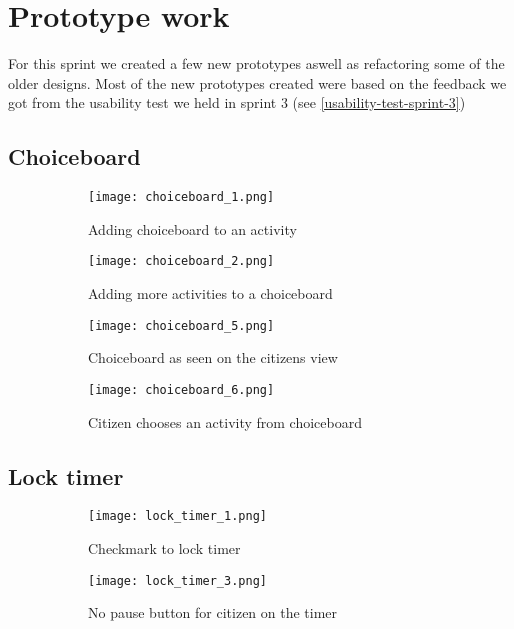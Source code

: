  \section{Prototype work}
For this sprint we created a few new prototypes aswell as refactoring some of the older designs. 
Most of the new prototypes created were based on the feedback we got from the usability test we held in sprint 3 (see \autoref{usability-test-sprint-3})

\subsection{Choiceboard}

\begin{figure}[H]
    \begin{subfigure}{0.5\textwidth}
    \texttt{[image: choiceboard\_1.png]}
    \caption{Adding choiceboard to an activity}
    \label{subfig:choiceboard_1}
    \end{subfigure}
    \begin{subfigure}{0.5\textwidth}
    \texttt{[image: choiceboard\_2.png]}
    \caption{Adding more activities to a choiceboard}
    \label{subfig:choiceboard_2}
    \end{subfigure} 
    \caption{}
    \label{fig:choiceboard_1}
\end{figure}

\begin{figure}[H]
    \begin{subfigure}{0.5\textwidth}
    \texttt{[image: choiceboard\_5.png]}
    \caption{Choiceboard as seen on the citizens view}
    \label{subfig:choiceboard_5}
    \end{subfigure}
    \begin{subfigure}{0.5\textwidth}
        \texttt{[image: choiceboard\_6.png]}
    \caption{Citizen chooses an activity from choiceboard}
    \label{subfig:choiceboard_6}
    \end{subfigure} 
    \caption{}
    \label{fig:choiceboard_2}
\end{figure}

\subsection{Lock timer}

\begin{figure}[H]
    \begin{subfigure}{0.5\textwidth}
    \texttt{[image: lock\_timer\_1.png]}
    \caption{Checkmark to lock timer}
    \label{subfig:lock_timer_1}
    \end{subfigure}
    \begin{subfigure}{0.5\textwidth}
        \texttt{[image: lock\_timer\_3.png]}
    \caption{No pause button for citizen on the timer}
    \label{subfig:lock_timer_3}
    \end{subfigure} 
    \caption{}
    \label{fig:lock_timer}
\end{figure}

